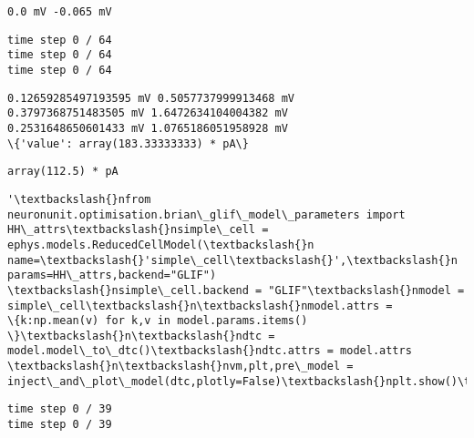     \begin{Verbatim}[commandchars=\\\{\}]
0.0 mV -0.065 mV
    \end{Verbatim}

    \begin{Verbatim}[commandchars=\\\{\}]
time step 0 / 64
time step 0 / 64
time step 0 / 64
    \end{Verbatim}

    \begin{Verbatim}[commandchars=\\\{\}]
0.12659285497193595 mV 0.5057737999913468 mV
0.3797368751483505 mV 1.6472634104004382 mV
0.2531648650601433 mV 1.0765186051958928 mV
\{'value': array(183.33333333) * pA\}
    \end{Verbatim}

            \begin{tcolorbox}[breakable, size=fbox, boxrule=.5pt, pad at break*=1mm, opacityfill=0]
\begin{Verbatim}[commandchars=\\\{\}]
array(112.5) * pA
\end{Verbatim}
\end{tcolorbox}
        
            \begin{tcolorbox}[breakable, size=fbox, boxrule=.5pt, pad at break*=1mm, opacityfill=0]
\begin{Verbatim}[commandchars=\\\{\}]
'\textbackslash{}nfrom neuronunit.optimisation.brian\_glif\_model\_parameters import
HH\_attrs\textbackslash{}nsimple\_cell = ephys.models.ReducedCellModel(\textbackslash{}n
name=\textbackslash{}'simple\_cell\textbackslash{}',\textbackslash{}n        params=HH\_attrs,backend="GLIF")
\textbackslash{}nsimple\_cell.backend = "GLIF"\textbackslash{}nmodel = simple\_cell\textbackslash{}n\textbackslash{}nmodel.attrs =
\{k:np.mean(v) for k,v in model.params.items() \}\textbackslash{}n\textbackslash{}ndtc =
model.model\_to\_dtc()\textbackslash{}ndtc.attrs = model.attrs \textbackslash{}n\textbackslash{}nvm,plt,pre\_model =
inject\_and\_plot\_model(dtc,plotly=False)\textbackslash{}nplt.show()\textbackslash{}n'
\end{Verbatim}
\end{tcolorbox}
        
    \begin{Verbatim}[commandchars=\\\{\}]
time step 0 / 39
time step 0 / 39
    \end{Verbatim}

